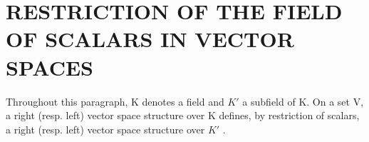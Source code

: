 \section{RESTRICTION OF THE FIELD OF SCALARS IN VECTOR SPACES}

Throughout this paragraph, K denotes a field and \(K'\) a subfield of K. On a set V, a right (resp. left) vector space structure over K defines, by restriction of scalars, a right (resp. left) vector space structure over \(K'\) .

